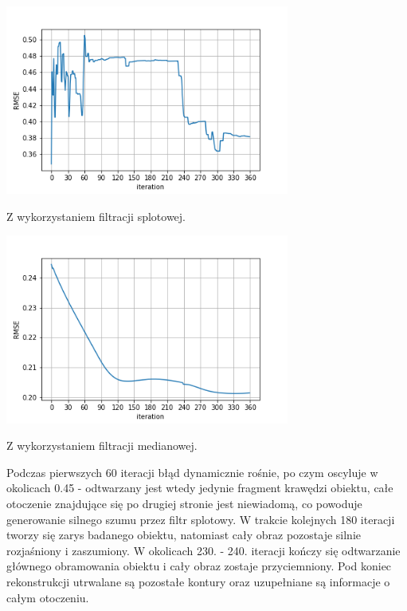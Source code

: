 \documentclass[a4paper, 11pt]{article}
\begin{document}
\begin{center}
	\includegraphics[width=0.7\textwidth]{change.png}
	
	Z wykorzystaniem filtracji splotowej.
\end{center}

\begin{center}
	\includegraphics[width=0.7\textwidth]{change_no_convolve.png}
	
	Z wykorzystaniem filtracji medianowej.
\end{center}


Podczas pierwszych 60 iteracji błąd dynamicznie rośnie, po czym oscyluje w okolicach 0.45 - odtwarzany jest wtedy jedynie fragment krawędzi obiektu, całe otoczenie znajdujące się po drugiej stronie jest niewiadomą, co powoduje generowanie silnego szumu przez filtr splotowy. W trakcie kolejnych 180 iteracji tworzy się zarys badanego obiektu, natomiast cały obraz pozostaje silnie rozjaśniony i zaszumiony. W okolicach 230. - 240. iteracji kończy się odtwarzanie głównego obramowania obiektu i cały obraz zostaje przyciemniony. Pod koniec rekonstrukcji utrwalane są pozostałe kontury oraz uzupełniane są informacje o całym otoczeniu.
\end{document}
